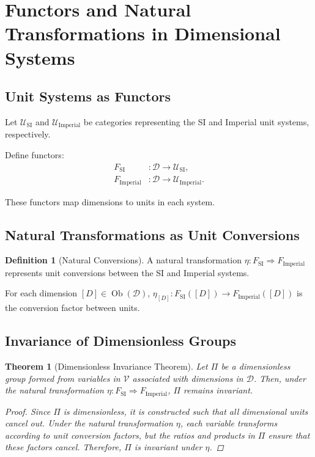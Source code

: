 \documentclass{article}
\newtheorem{theorem}{Theorem}[section]
\theoremstyle{definition}
\newtheorem{definition}{Definition}[section]
\theoremstyle{remark}
\begin{document}
	\section{Functors and Natural Transformations in Dimensional Systems}
	
	\subsection{Unit Systems as Functors}
	
	Let $\mathcal{U}_{\text{SI}}$ and $\mathcal{U}_{\text{Imperial}}$ be categories representing the SI and Imperial unit systems, respectively.
	
	Define functors:
	\begin{align*}
		F_{\text{SI}} &: \mathcal{D} \rightarrow \mathcal{U}_{\text{SI}}, \\
		F_{\text{Imperial}} &: \mathcal{D} \rightarrow \mathcal{U}_{\text{Imperial}}.
	\end{align*}
	
	These functors map dimensions to units in each system.
	
	\subsection{Natural Transformations as Unit Conversions}
	
	\begin{definition}[Natural Conversions]
		A natural transformation $\eta: F_{\text{SI}} \Rightarrow F_{\text{Imperial}}$ represents unit conversions between the SI and Imperial systems.
		
		For each dimension $[D] \in \operatorname{Ob}(\mathcal{D})$, $\eta_{[D]}: F_{\text{SI}}([D]) \rightarrow F_{\text{Imperial}}([D])$ is the conversion factor between units.
	\end{definition}
	
	\subsection{Invariance of Dimensionless Groups}
	
	\begin{theorem}[Dimensionless Invariance Theorem]
		Let $\Pi$ be a dimensionless group formed from variables in $\mathcal{V}$ associated with dimensions in $\mathcal{D}$. Then, under the natural transformation $\eta: F_{\text{SI}} \Rightarrow F_{\text{Imperial}}$, $\Pi$ remains invariant.
		
		\begin{proof}
			Since $\Pi$ is dimensionless, it is constructed such that all dimensional units cancel out. Under the natural transformation $\eta$, each variable transforms according to unit conversion factors, but the ratios and products in $\Pi$ ensure that these factors cancel. Therefore, $\Pi$ is invariant under $\eta$.
		\end{proof}
	\end{theorem}
	
\end{document}
